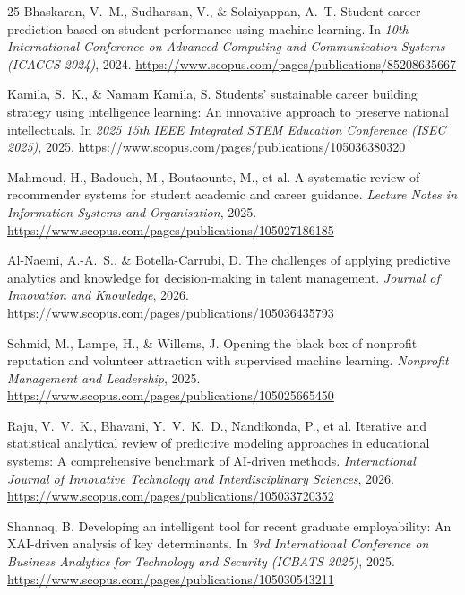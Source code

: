 \documentclass[10pt,twocolumn]{article}
\begin{document}
\begin{thebibliography}{25}
Bhaskaran, V.\ M., Sudharsan, V., \& Solaiyappan, A.\ T.
\newblock Student career prediction based on student performance using machine
learning.
\newblock In \emph{10th International Conference on Advanced Computing and
Communication Systems (ICACCS 2024)}, 2024.
\newblock \url{https://www.scopus.com/pages/publications/85208635667}

Kamila, S.\ K., \& Namam Kamila, S.
\newblock Students' sustainable career building strategy using intelligence
learning: An innovative approach to preserve national intellectuals.
\newblock In \emph{2025 15th IEEE Integrated STEM Education Conference
(ISEC 2025)}, 2025.
\newblock \url{https://www.scopus.com/pages/publications/105036380320}

Mahmoud, H., Badouch, M., Boutaounte, M., et al.
\newblock A systematic review of recommender systems for student academic and
career guidance.
\newblock \emph{Lecture Notes in Information Systems and Organisation}, 2025.
\newblock \url{https://www.scopus.com/pages/publications/105027186185}

Al-Naemi, A.-A.\ S., \& Botella-Carrubi, D.
\newblock The challenges of applying predictive analytics and knowledge for
decision-making in talent management.
\newblock \emph{Journal of Innovation and Knowledge}, 2026.
\newblock \url{https://www.scopus.com/pages/publications/105036435793}

Schmid, M., Lampe, H., \& Willems, J.
\newblock Opening the black box of nonprofit reputation and volunteer attraction
with supervised machine learning.
\newblock \emph{Nonprofit Management and Leadership}, 2025.
\newblock \url{https://www.scopus.com/pages/publications/105025665450}

Raju, V.\ V.\ K., Bhavani, Y.\ V.\ K.\ D., Nandikonda, P., et al.
\newblock Iterative and statistical analytical review of predictive modeling
approaches in educational systems: A comprehensive benchmark of AI-driven
methods.
\newblock \emph{International Journal of Innovative Technology and
Interdisciplinary Sciences}, 2026.
\newblock \url{https://www.scopus.com/pages/publications/105033720352}

Shannaq, B.
\newblock Developing an intelligent tool for recent graduate employability:
An XAI-driven analysis of key determinants.
\newblock In \emph{3rd International Conference on Business Analytics for
Technology and Security (ICBATS 2025)}, 2025.
\newblock \url{https://www.scopus.com/pages/publications/105030543211}


\end{thebibliography}
\end{document}
